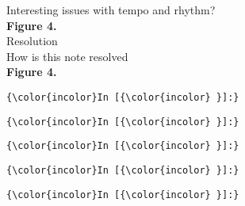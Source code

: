 \documentclass[11pt]{article}
\begin{document}
\noindent
Interesting issues with tempo and rhythm?
\\

\noindent
\textbf{Figure 4.}
\\\vspace{5mm} 
\noindent
Resolution
\\

\noindent
How is this note resolved
\\

\noindent
\textbf{Figure 4.}
\\
    \begin{Verbatim}[commandchars=\\\{\}]
{\color{incolor}In [{\color{incolor} }]:} 
\end{Verbatim}

    \begin{Verbatim}[commandchars=\\\{\}]
{\color{incolor}In [{\color{incolor} }]:} 
\end{Verbatim}

    \begin{Verbatim}[commandchars=\\\{\}]
{\color{incolor}In [{\color{incolor} }]:} 
\end{Verbatim}

    \begin{Verbatim}[commandchars=\\\{\}]
{\color{incolor}In [{\color{incolor} }]:} 
\end{Verbatim}

    \begin{Verbatim}[commandchars=\\\{\}]
{\color{incolor}In [{\color{incolor} }]:} 
\end{Verbatim}


    
    
    
    
\end{document}
